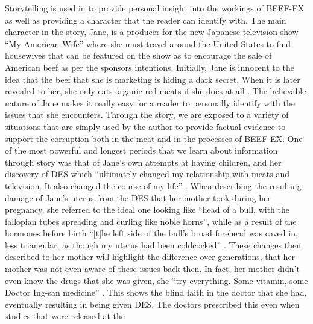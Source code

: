 \documentclass{article}
\begin{document}
Storytelling is used in  to provide personal insight
into the workings of BEEF-EX as well as providing a character that the
reader can identify with. The main character in the story, Jane, is a
producer for the new Japanese television show ``My American Wife'' where she
must travel around the United States to find housewives that can be featured
on the show as to encourage the sale of American beef as per the sponsors
intentions. Initially, Jane is innocent to the idea that the beef that she
is marketing is hiding a dark secret. When it is later revealed to her, she
only eats organic red meats if she does at all \cite[Ch. 9]{ozeki1998my}. The
believable nature of Jane makes it really easy for a reader to personally
identify with the issues that she encounters. Through the story, we are exposed
to a variety of situations that are simply used by the author to provide
factual evidence to support the corruption both in the meat and in the
processes of BEEF-EX. One of the most powerful and longest periods that we
learn about information through story was that of Jane's own attempts at
having children, and her discovery of DES which
``ultimately changed my relationship with meats and television. It also
changed the course of my life'' \cite[Ch. 6]{ozeki1998my}. When describing
the resulting damage of Jane's uterus from the DES that her mother took
during her pregnancy, she referred to the ideal one looking like ``head of a
bull, with the fallopian tubes spreading and curling like noble horns'',
while as a result of the hormones before birth ``[t]he left side of the
bull’s broad forehead was caved in, less triangular, as though my uterus had
been coldcocked'' \cite[Ch. 7]{ozeki1998my}. These changes then described to
her mother will highlight the difference over generations, that her mother
was not even aware of these issues back then. In fact, her mother didn't
even know the drugs that she was given, she ``try everything. Some vitamin,
some Doctor Ing-san medicine'' \cite[Ch. 11]{ozeki1998my}. This shows the
blind faith in the doctor that she had, eventually resulting in being given
DES. The doctors prescribed this even when studies that were released at the
\end{document}
